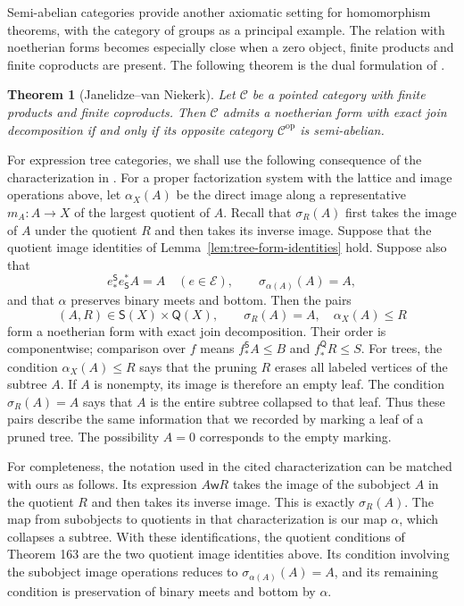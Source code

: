 \documentclass[11pt,a4paper]{article}
\theoremstyle{plain}
\newtheorem{theorem}{Theorem}[section]
\theoremstyle{definition}
\theoremstyle{remark}
\begin{document}
Semi-abelian categories provide another axiomatic setting for
homomorphism theorems, with the category of groups as a principal
example. The relation with noetherian forms becomes especially
close when a zero object, finite products and finite coproducts
are present. The following theorem is the dual formulation of
\cite[Theorem 177, equivalence of \textup{(ii)} and \textup{(vi)}]{JanelidzeVanNiekerk}.

\begin{theorem}[Janelidze--van Niekerk]\label{lem:ejd-semiabelian-opposite}
Let $\mathcal C$ be a pointed category with finite products and
finite coproducts. Then $\mathcal C$ admits a noetherian form
with exact join decomposition if and only if its opposite category
$\mathcal C^{\mathrm{op}}$ is semi-abelian.
\end{theorem}

For expression tree categories, we shall use the following
consequence of the characterization in
\cite[Theorems 159 and 163]{JanelidzeVanNiekerk}. For a proper
factorization system with the lattice and image operations above,
let $\alpha_X(A)$ be the direct image along a representative
$m_A:A\to X$ of the largest quotient of $A$.
Recall that $\sigma_R(A)$ first takes the image of $A$ under
the quotient $R$ and then takes its inverse image.
Suppose that the quotient image identities of
Lemma~\ref{lem:tree-form-identities} hold. Suppose also that
\[
 e_*^{\mathsf S}e_{\mathsf S}^*A=A
 \quad(e\in\mathcal E),\qquad
 \sigma_{\alpha(A)}(A)=A,
\]
and that $\alpha$ preserves binary meets and bottom. Then the
pairs
\begin{equation}\label{eq:tree-pairs}
 (A,R)\in\mathsf S(X)\times\mathsf Q(X),\qquad
 \sigma_R(A)=A,\quad\alpha_X(A)\le R
\end{equation}
form a noetherian form with exact join decomposition. Their order
is componentwise; comparison over $f$ means
$f_*^{\mathsf S}A\le B$ and $f_*^{\mathsf Q}R\le S$.
For trees, the condition $\alpha_X(A)\le R$ says that the
pruning $R$ erases all labeled vertices of the subtree $A$.
If $A$ is nonempty, its image is therefore an empty leaf.
The condition $\sigma_R(A)=A$ says that $A$ is the entire
subtree collapsed to that leaf. Thus these pairs describe the
same information that we recorded by marking a leaf of a pruned
tree. The possibility $A=0$ corresponds to the empty marking.

For completeness, the notation used in the cited characterization
can be matched with ours as follows. Its expression $A\mathsf wR$
takes the image of the subobject $A$ in the quotient $R$ and
then takes its inverse image. This is exactly $\sigma_R(A)$.
The map from subobjects to quotients in that characterization is
our map $\alpha$, which collapses a subtree. With these
identifications, the quotient conditions of Theorem 163 are
the two quotient image identities above. Its condition involving
the subobject image operations reduces to
$\sigma_{\alpha(A)}(A)=A$, and its remaining condition is
preservation of binary meets and bottom by $\alpha$.
\end{document}
